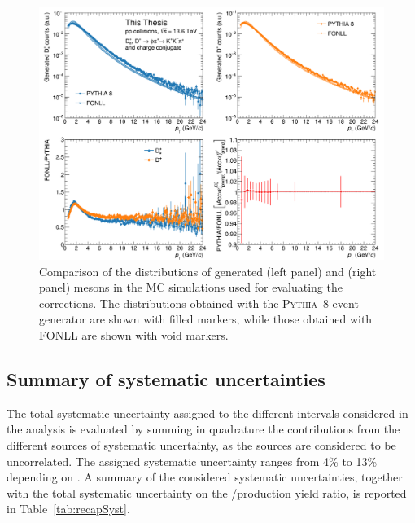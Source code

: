 \begin{figure}[htb]
    \begin{center}
    \includegraphics[width=\textwidth]{Figures/Chapter 6/PtShape.png}
    \caption{Comparison of the \pt distributions of generated \ds (left panel) and \dpl (right panel) mesons in the MC simulations used for evaluating the \aeff corrections. The distributions obtained with the \textsc{Pythia~8} event generator are shown with filled markers, while those obtained with FONLL are shown with void markers.} 
    \label{fig:MCptshape} 
    \end{center}
\end{figure}

\subsection{Summary of systematic uncertainties}
The total systematic uncertainty assigned to the different \pt intervals considered in the analysis is evaluated by summing in quadrature the contributions from the different sources of systematic uncertainty, as the sources are considered to be uncorrelated. The assigned systematic uncertainty ranges from 4\% to 13\% depending on \pt. A summary of the considered systematic uncertainties, together with the total systematic uncertainty on the \ds/\dpl production yield ratio, is reported in Table~\ref{tab:recapSyst}.

